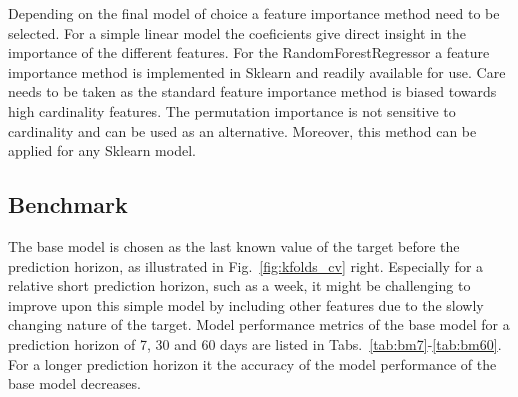 \documentclass{article}
\begin{document}
Depending on the final model of choice a feature importance method need to be selected. For a simple linear model the coeficients give direct insight in the importance of the different features. For the RandomForestRegressor a feature importance method is implemented in Sklearn and readily available for use. Care needs to be taken as the standard feature importance method is biased towards high cardinality features. The permutation importance is not sensitive to cardinality and can be used as an alternative. Moreover, this method can be applied for any Sklearn model.

\subsection*{Benchmark}

The base model is chosen as the last known value of the target before the prediction horizon, as illustrated in Fig.~\ref{fig:kfolds_cv} right. Especially for a relative short prediction horizon, such as a week, it might be challenging to improve upon this simple model by including other features due to the slowly changing nature of the target. Model performance metrics of the base model for a prediction horizon of 7, 30 and 60 days are listed in Tabs.~\ref{tab:bm7}-\ref{tab:bm60}. For a longer prediction horizon it the accuracy of the model performance of the base model decreases. 
\end{document}
